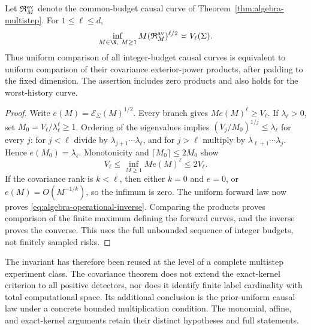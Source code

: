 \begin{corollary}
\label{cor:algebra-operational-inverse}
Let $\mathfrak R_M^{\rm av}$ denote the common-budget causal curve of
Theorem~\ref{thm:algebra-multistep}. For $1\le\ell\le d$,
\begin{equation}\label{eq:algebra-operational-inverse}
 \inf_{M\in\N,\ M\ge1}M(\mathfrak R_M^{\rm av})^{\ell/2}
                         \asymp V_\ell(\Sigma).
\end{equation}
Thus uniform comparison of all integer-budget causal curves is
equivalent to uniform comparison of their covariance exterior-power
products, after padding to the fixed dimension. The assertion includes
zero products and also holds for the worst-history curve.
\end{corollary}
\begin{proof}
Write $e(M)=\mathcal E_\Sigma(M)^{1/2}$. Every branch gives
$Me(M)^\ell\ge V_\ell$. If $\lambda_\ell>0$, set
$M_0=V_\ell/\lambda_\ell^\ell\ge1$. Ordering of the eigenvalues
implies $(V_j/M_0)^{1/j}\le\lambda_\ell$ for every $j$:
for $j<\ell$ divide by $\lambda_{j+1}\cdots\lambda_\ell$, and
for $j>\ell$ multiply by $\lambda_{\ell+1}\cdots\lambda_j$.
Hence $e(M_0)=\lambda_\ell$. Monotonicity and
$\lceil M_0\rceil\le2M_0$ show
\[
 V_\ell\le\inf_{M\ge1}Me(M)^\ell\le2V_\ell.
\]
If the covariance rank is $k<\ell$, then either $k=0$ and $e=0$,
or $e(M)=O(M^{-1/k})$, so the infimum is zero. The uniform forward
law now proves \eqref{eq:algebra-operational-inverse}. Comparing the
products proves comparison of the finite maximum defining the forward
curves, and the inverse proves the converse. This uses the full
unbounded sequence of integer budgets, not finitely sampled risks.
\end{proof}

The invariant has therefore been reused at the level of a complete
multistep experiment class. The covariance theorem does not extend the
exact-kernel criterion to all positive detectors, nor does it identify
finite label cardinality with total computational space. Its additional
conclusion is the prior-uniform causal law under a concrete bounded
multiplication condition. The monomial, affine, and exact-kernel
arguments retain their distinct hypotheses and full statements.
